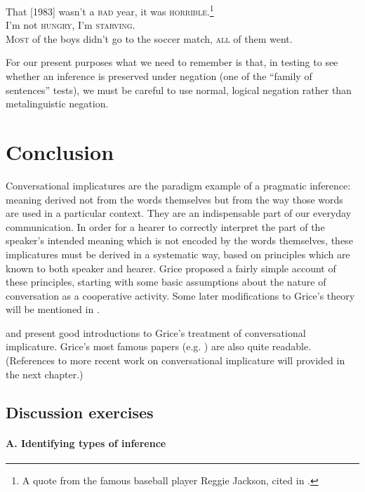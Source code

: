 \ea \label{ex:8.29}
\ea That [1983] wasn’t a \textsc{bad} year, it was \textsc{horrible}.\footnote{A quote from the famous baseball player Reggie Jackson, cited in \citet[382]{Horn1989}.}\\
\ex I’m not \textsc{hungry}, I’m \textsc{starving}.\\
\ex \textsc{Most} of the boys didn’t go to the soccer match, \textsc{all} of them went.
                       \z
\z


For our present purposes what we need to remember is that, in testing to see whether an inference is preserved under negation (one of the “family of sentences” tests), we must be careful to use normal, logical negation rather than metalinguistic negation.


\section{Conclusion}\label{sec:8.7}

Conversational implicatures are the paradigm example of a pragmatic inference: meaning derived not from the words themselves but from the way those words are used in a particular context. They are an indispensable part of our everyday communication. In order for a hearer to correctly interpret the part of the speaker’s intended meaning which is not encoded by the words themselves, these implicatures must be derived in a systematic way, based on principles which are known to both speaker and hearer. Grice proposed a fairly simple account of these principles, starting with some basic assumptions about the nature of conversation as a cooperative activity. Some later modifications to Grice’s theory will be mentioned in .



\furtherreading



\citet[ch. 3]{Levinson1983} and \citet[ch. 2]{Birner2013} present good introductions to Grice’s treatment of conversational implicature. Grice’s most famous papers (e.g. \citeyear{Grice1975,Grice1978,Grice1981}) are also quite readable. (References to more recent work on conversational implicature will provided in the next chapter.)


\subsection*{Discussion exercises}
\paragraph*{A. Identifying types of inference}

